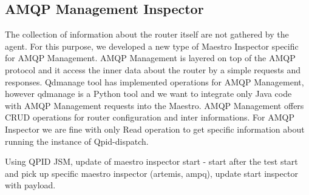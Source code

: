 
\subsection{AMQP Management Inspector}
\label{AMQP Management Inspector}
The collection of information about the router itself are not gathered by the agent. For this purpose, we developed a new type of Maestro Inspector specific for AMQP Management. AMQP Management is layered on top of the AMQP protocol and it access the inner data about the router by a simple requests and responses. Qdmanage tool has implemented operations for AMQP Management, however qdmanage is a Python tool and we want to integrate only Java code with AMQP Management requests into the Maestro. AMQP Management offers CRUD operations for router configuration and inter informations. For AMQP Inspector we are fine with only Read operation to get specific information about running the instance of Qpid-dispatch.



Using QPID JSM, update of maestro inspector start - start after the test start and pick up specific maestro inspector (artemis, ampq), update start inspector with payload.

